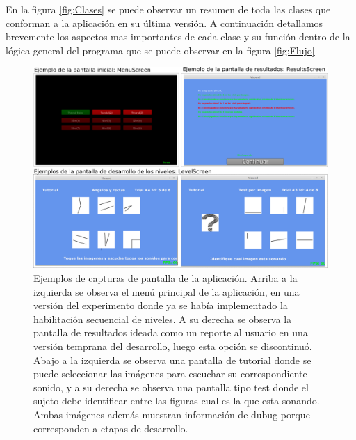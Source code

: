 \documentclass{article}
\begin{document}
    En la figura \ref{fig:Clases} se puede observar un resumen de toda las clases que conforman a la aplicación en su última versión. A continuación detallamos brevemente los aspectos mas importantes de cada clase y su función dentro de la lógica general del programa que se puede observar en la figura \ref{fig:Flujo}
    
            
    \begin{figure}
        \center
        \includegraphics[width=\textwidth]{Imagenes/Pantallas1.png}
        \caption{Ejemplos de  capturas de pantalla de la aplicación. Arriba a la izquierda se observa el menú principal de la aplicación, en una versión del experimento donde ya se había implementado la habilitación secuencial de niveles. A su derecha se observa la pantalla de resultados ideada como un reporte al usuario en una versión temprana del desarrollo, luego esta opción se discontinuó. Abajo a la izquierda se observa una pantalla de tutorial donde se puede seleccionar las imágenes para escuchar su correspondiente sonido, y a su derecha se observa una pantalla tipo test donde el sujeto debe identificar entre las figuras cual es la que esta sonando. Ambas imágenes además muestran información de dubug porque corresponden a etapas de desarrollo. }
        \label{fig:Pantallas1}
    \end{figure}
    
    
    
\end{document}
